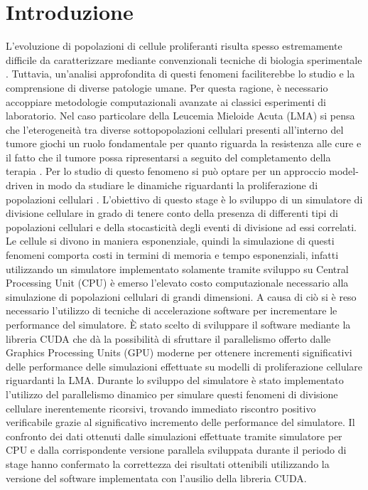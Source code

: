 
\chapter{Introduzione} %

\label{Introduzione} %



L’evoluzione di popolazioni di cellule proliferanti risulta spesso estremamente
difficile da caratterizzare mediante convenzionali tecniche di biologia
sperimentale \cite{aml2018unimib}. Tuttavia, un’analisi approfondita di questi fenomeni
faciliterebbe lo studio e la comprensione di diverse patologie umane.
Per questa ragione, è necessario accoppiare metodologie computazionali 
avanzate ai classici esperimenti di laboratorio. Nel caso particolare della 
Leucemia Mieloide Acuta (LMA) si pensa che l'eterogeneità tra diverse 
sottopopolazioni cellulari presenti all'interno del tumore giochi un ruolo 
fondamentale per quanto riguarda la resistenza alle cure e il fatto che il 
tumore possa ripresentarsi a seguito del completamento della terapia \cite{aml2018unimib}.
Per lo studio di questo fenomeno si può optare per un approccio model-driven 
in modo da studiare le dinamiche riguardanti la proliferazione di 
popolazioni cellulari \cite{aml2018unimib}. L'obiettivo di questo stage è lo sviluppo di un 
simulatore di divisione cellulare in grado di tenere conto della presenza 
di differenti tipi di popolazioni cellulari e della stocasticità degli eventi
di divisione ad essi correlati. Le cellule si divono in maniera esponenziale, 
quindi la simulazione di questi fenomeni comporta costi in termini di memoria 
e tempo esponenziali, infatti utilizzando un simulatore implementato 
solamente tramite sviluppo su Central Processing Unit (CPU) 
è emerso l'elevato costo 
computazionale necessario alla simulazione di popolazioni cellulari di grandi 
dimensioni. A causa di ciò si è reso necessario 
l'utilizzo di tecniche di accelerazione software per incrementare le 
performance del simulatore. È stato scelto di sviluppare il software 
mediante la libreria CUDA che dà la possibilità di sfruttare il parallelismo 
offerto dalle Graphics Processing Units (GPU) moderne per ottenere incrementi 
significativi delle performance delle simulazioni effettuate su modelli di 
proliferazione cellulare riguardanti la LMA.
Durante lo sviluppo del simulatore è stato implementato l'utilizzo del 
parallelismo dinamico per simulare questi fenomeni 
di divisione cellulare inerentemente ricorsivi, trovando immediato riscontro 
positivo verificabile grazie al significativo incremento delle performance 
del simulatore. Il confronto dei dati ottenuti dalle simulazioni effettuate
tramite simulatore per CPU e dalla corrispondente versione parallela 
sviluppata durante il periodo di stage hanno confermato la correttezza dei
risultati ottenibili utilizzando la versione del software implementata con
l'ausilio della libreria CUDA.
